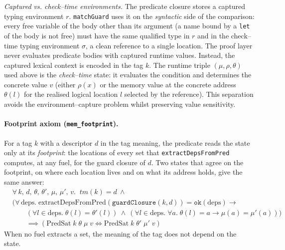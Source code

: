 \documentclass[12pt]{article}
\begin{document}
\emph{Captured vs. check--time environments.} The predicate closure stores a captured typing environment \(r\). \texttt{matchGuard} uses it on the \emph{syntactic} side of the comparison: every free variable of the body other than its argument (a name bound by a \texttt{let} of the body is not free) must have the same qualified type in \(r\) and in the check--time typing environment \(\sigma\), a clean reference to a single location. The proof layer never evaluates predicate bodies with captured runtime values. Instead, the captured lexical context is encoded in the tag \(k\). The runtime triple \((\mu, \rho, \theta)\) used above is the \emph{check--time} state: it evaluates the condition and determines the concrete value \(v\) (either \(\rho(x)\) or the memory value at the concrete address \(\theta(l)\) for the realised logical location \(l\) selected by the reference). This separation avoids the environment--capture problem whilst preserving value sensitivity.

\paragraph{Footprint axiom (\texttt{mem\_footprint}).} For a tag $k$ with a
descriptor $d$ in the tag meaning, the predicate reads the state only at its
\emph{footprint}: the locations of every set that \texttt{extractDepsFromPred}
computes, at any fuel, for the guard closure of $d$.  Two states that agree on
the footprint, on where each location lives and on what its address holds,
give the same answer:
\[
\begin{aligned}
&\forall\, k,\, d,\, \theta,\, \theta',\, \mu,\, \mu',\, v.\;\; tm(k) = d\ \land\\
&\big(\forall\, \text{deps}.\; \text{extractDepsFromPred}(\texttt{guardClosure}(k, d)) = \texttt{ok}(\text{deps}) \rightarrow\\
&\qquad (\forall l \in \text{deps}.\; \theta(l) = \theta'(l))\ \land\
 (\forall l \in \text{deps}.\; \forall a.\; \theta(l)=a \rightarrow \mu(a) = \mu'(a))\big)\\
&\qquad \implies (\text{PredSat}\; k\; \theta\; \mu\; v \iff \text{PredSat}\; k\; \theta'\; \mu'\; v)
\end{aligned}
\]
When no fuel extracts a set, the meaning of the tag does not depend on the
state.
\end{document}
